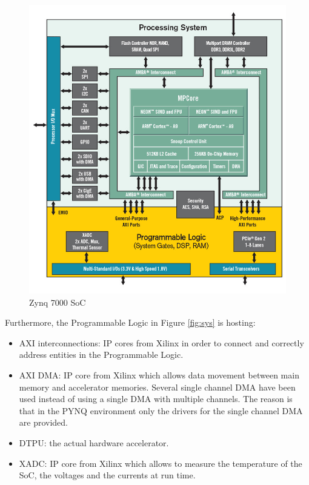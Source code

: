 \begin{figure}[!htbp]
\centering
\captionsetup{justification=centering}
\includegraphics[scale=0.35]{./figure/zynq.PNG}
\caption{Zynq 7000 SoC \cite{paper:42}}
\label{fig:zynq}
\end{figure}

Furthermore, the Programmable Logic in Figure \ref{fig:sys} is hosting:
\begin{itemize}
\item AXI interconnections: IP cores from Xilinx \cite{paper:34} \cite{paper:35} in order to connect and correctly address entities in the Programmable Logic.
\item AXI DMA: IP core from Xilinx \cite{paper:33} which allows data movement between main memory and accelerator memories.  Several single channel DMA have been used instead of using a single DMA with multiple channels. The reason is that in the PYNQ environment only the drivers for the single channel DMA are provided. 
\item DTPU: the actual hardware accelerator.
\item XADC: IP core from Xilinx \cite{paper:32} which allows to measure the temperature of the SoC, the voltages and the currents at run time.

\end{itemize}


